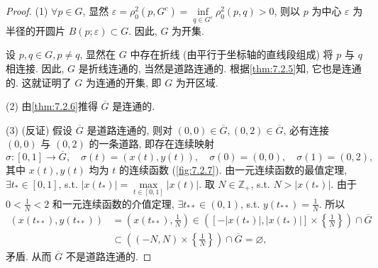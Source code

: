 \begin{proof}
(1) $\forall p \in G$, 显然 $\varepsilon = \rho_{0}^{2}(p, G^{c}) = \inf\limits_{q \in G^{c}} \rho_{0}^{2}(p,q) > 0$, 则以 $p$ 为中心 $\varepsilon$ 为半径的开圆片 $B(p; \varepsilon) \subset G$. 因此, $G$ 为开集.

设 $p, q \in G, p \neq q$, 显然在 $G$ 中存在折线 (由平行于坐标轴的直线段组成) 将 $p$ 与 $q$ 相连接. 因此, $G$ 是折线连通的, 当然是道路连通的. 根据\cref{thm:7.2.5}知, 它也是连通的. 这就证明了 $G$ 为连通的开集, 即 $G$ 为开区域.

(2) 由\cref{thm:7.2.6}推得 $\overline{G}$ 是连通的.

(3) (反证) 假设 $\overline{G}$ 是道路连通的, 则对 $(0,0) \in \overline{G}, (0,2) \in \overline{G}$, 必有连接 $(0,0)$ 与 $(0,2)$ 的一条道路, 即存在连续映射
\[
  \sigma\colon [0,1] \to \overline{G}, \quad \sigma(t) = (x(t), y(t)), \quad \sigma(0) = (0,0), \quad \sigma(1) = (0,2),
\]
其中 $x(t), y(t)$ 均为 $t$ 的连续函数 (\cref{fig:7.2.7}). 由一元连续函数的最值定理, $\exists t_{*} \in [0,1]$, s.t. $|x(t_{*})| = \max\limits_{t \in [0,1]} |x(t)|$. 取 $N \in \mathbb{Z}_{+}$, s.t. $N > |x(t_{*})|$. 由于 $0 < \frac{1}{N} < 2$ 和一元连续函数的介值定理, $\exists t_{**} \in (0,1)$, s.t. $y(t_{**}) = \frac{1}{N}$. 所以
\begin{align*}
  (x(t_{**}), y(t_{**})) &= \left(x(t_{**}), \frac{1}{N}\right) \in \left([-|x(t_{*})|, |x(t_{*})|] \times \left\{\frac{1}{N}\right\}\right) \cap \overline{G} \\
  &\subset \left((-N, N) \times \left\{\frac{1}{N}\right\}\right) \cap \overline{G} = \varnothing,
\end{align*}
矛盾. 从而 $\overline{G}$ 不是道路连通的.
\end{proof}

